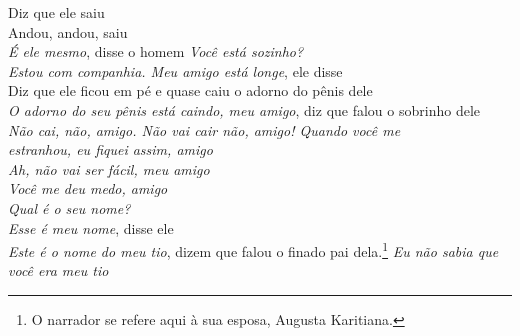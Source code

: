 \bigskip

\begin{linenumbers}
 
\noindent   Diz que ele saiu\\
  Andou, andou, saiu\\
  \textit{É ele mesmo}, disse o homem \textit{Você está sozinho?}\\
  \textit{Estou com companhia. Meu amigo está longe}, ele disse\\
  Diz que ele ficou em pé e quase caiu o adorno do pênis dele\\
  \textit{O adorno do seu pênis está caindo, meu amigo}, diz que falou o sobrinho dele\\
  \textit{Não cai, não, amigo. Não vai cair não, amigo! Quando você me\\
 estranhou, eu fiquei assim, amigo}\\
  \textit{Ah, não vai ser fácil, meu amigo}\\
  \textit{Você me deu medo, amigo}\\
  \textit{Qual é o seu nome?}\\
  \textit{Esse é meu nome}, disse ele\\
  \textit{Este é o nome do meu tio}, dizem que falou o finado pai
 dela.\footnote{O narrador se refere aqui à sua esposa, Augusta Karitiana.}
 \textit{Eu não sabia que você era meu tio}
 
\end{linenumbers}

\bigskip

